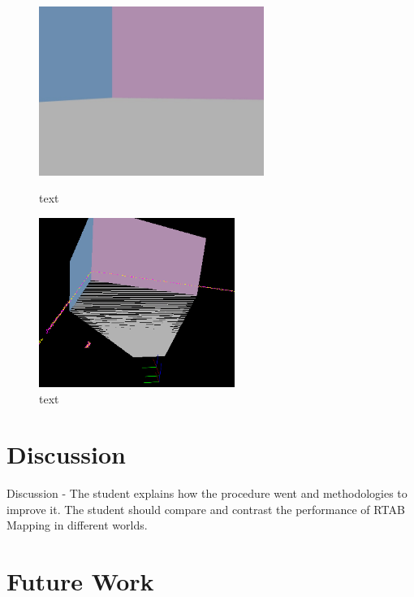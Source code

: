 \documentclass[a4paper]{article}
\begin{document}
\begin{figure}[h]
\centering
\begin{minipage}{0.45\textwidth}
\centering
\includegraphics[height=5.5cm]{slam_house_features_corner_3}
\caption{text}
\end{minipage}
\hspace{1cm}
\begin{minipage}{0.45\textwidth}
\centering
\includegraphics[height=5.5cm]{slam_house_constraints_3}
\caption{text}
\end{minipage}
\end{figure}


\section{Discussion}
Discussion - The student explains how the procedure went and methodologies to improve it. The student should compare and contrast the performance of RTAB Mapping in different worlds.


\section{Future Work}




\end{document}
